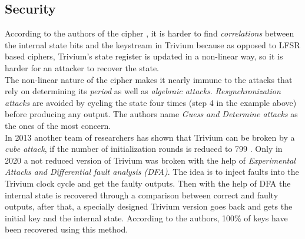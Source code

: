 \subsection{Security}
According to the authors of the cipher \cite{canniere2008trivium}, it is harder to find \emph{correlations} between the internal state bits and the keystream in Trivium because as opposed to LFSR based ciphers, Trivium's state register is updated in a non-linear way, so it is harder for an attacker to recover the state.\\
The non-linear nature of the cipher makes it nearly immune to the attacks that rely on determining its \emph{period} as well as \emph{algebraic attacks}. \emph{Resynchronization attacks} are avoided by cycling the state four times (step 4 in the example above) before producing any output. The authors name \emph{Guess and Determine attacks} as the ones of the most concern.\\
In 2013 another team of researchers has shown that Trivium can be broken by a \emph{cube attack}, if the number of initialization rounds is reduced to 799 \cite{fouque2013improving}. 
Only in 2020 \cite{potestad2020breaking} a not reduced version of Trivium was broken with the help of \emph{Experimental Attacks and Differential fault analysis (DFA)}. The idea is to inject faults into the Trivium clock cycle and get the faulty outputs. Then with the help of DFA the internal state is recovered through a comparison between correct and faulty outputs, after that, a specially designed Trivium version goes back and gets the initial key and the internal state. According to the authors, 100\% of keys have been recovered using this method.


